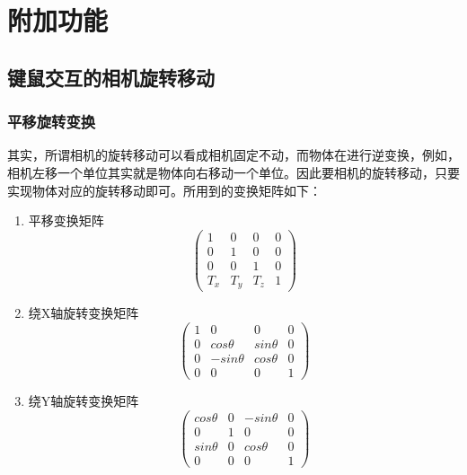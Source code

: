 

    \chapter{附加功能}

	
	\section{键鼠交互的相机旋转移动}
	\subsection{平移旋转变换}
	\begin{spacing}{2.5}
	其实，所谓相机的旋转移动可以看成相机固定不动，而物体在进行逆变换，例如，相机左移一个单位其实就是物体向右移动一个单位。因此要相机的旋转移动，只要实现物体对应的旋转移动即可。所用到的变换矩阵如下：
	\begin{enumerate}
		\item 平移变换矩阵
		\begin{equation}
		\begin{pmatrix}
			1 &  0&  0&0 \\ 
 			0&  1&  0& 0\\ 
 			0& 0 & 1 &0 \\ 
 			T_{x}&  T_{y}&  T_{z}& 1
		\end{pmatrix}
		\label{transfer_1}
		\end{equation}
		\item 	绕X轴旋转变换矩阵
		\begin{equation}
		\begin{pmatrix}
			 1&  0&  0 &0 \\ 
 			0&  cos\theta &  sin\theta& 0\\ 
 			 0& -sin\theta & cos\theta &0 \\ 
 			0&  0&  0& 1
		\end{pmatrix}
		\label{yrotate}
		\end{equation}
		\item 绕Y轴旋转变换矩阵
		\begin{equation}
		\begin{pmatrix}
			cos\theta &  0&  -sin\theta &0 \\ 
 			0&  1&  0& 0\\ 
 			sin\theta & 0 & cos\theta &0 \\ 
 			0&  0&  0& 1
		\end{pmatrix}
		\label{xrotate}	
		\end{equation}
	

\end{enumerate}
\end{spacing}
